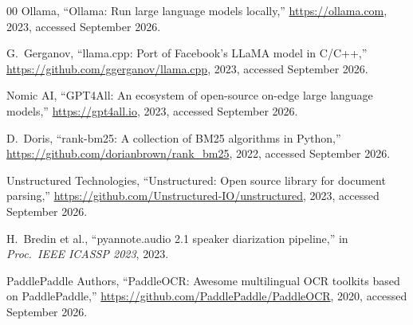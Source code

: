 \documentclass[conference]{IEEEtran}
\begin{document}
\begin{thebibliography}{00}
Ollama,
``Ollama: Run large language models locally,''
\url{https://ollama.com}, 2023, accessed September 2026.

G.~Gerganov,
``llama.cpp: Port of Facebook's LLaMA model in C/C++,''
\url{https://github.com/ggerganov/llama.cpp}, 2023, accessed September 2026.

Nomic AI,
``GPT4All: An ecosystem of open-source on-edge large language models,''
\url{https://gpt4all.io}, 2023, accessed September 2026.

D.~Doris,
``rank-bm25: A collection of BM25 algorithms in Python,''
\url{https://github.com/dorianbrown/rank_bm25}, 2022, accessed September 2026.

Unstructured Technologies,
``Unstructured: Open source library for document parsing,''
\url{https://github.com/Unstructured-IO/unstructured}, 2023,
accessed September 2026.

H.~Bredin et al.,
``pyannote.audio 2.1 speaker diarization pipeline,''
in \textit{Proc.\ IEEE ICASSP 2023}, 2023.

PaddlePaddle Authors,
``PaddleOCR: Awesome multilingual OCR toolkits based on PaddlePaddle,''
\url{https://github.com/PaddlePaddle/PaddleOCR}, 2020,
accessed September 2026.

\end{thebibliography}
\end{document}
